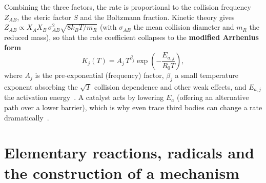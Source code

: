 Combining the three factors, the rate is proportional to the collision frequency $Z_{AB}$, the steric factor $S$ and the Boltzmann fraction. Kinetic theory gives $Z_{AB}\propto X_A X_B\,\sigma_{AB}^2\sqrt{8k_BT/m_R}$ (with $\sigma_{AB}$ the mean collision diameter and $m_R$ the reduced mass), so that the rate coefficient collapses to the \textbf{modified Arrhenius form}
\begin{equation}
K_j(T)=A_j\,T^{\beta_j}\exp\!\left(-\frac{E_{a,j}}{R_0 T}\right),
\label{eq:arrhenius}
\end{equation}
where $A_j$ is the pre-exponential (frequency) factor, $\beta_j$ a small temperature exponent absorbing the $\sqrt{T}$ collision dependence and other weak effects, and $E_{a,j}$ the activation energy~\cite{lecture3,glassman2014combustion}. A catalyst acts by lowering $E_a$ (offering an alternative path over a lower barrier), which is why even trace third bodies can change a rate dramatically~\cite{lecture3}.

\section{Elementary reactions, radicals and the construction of a mechanism}

